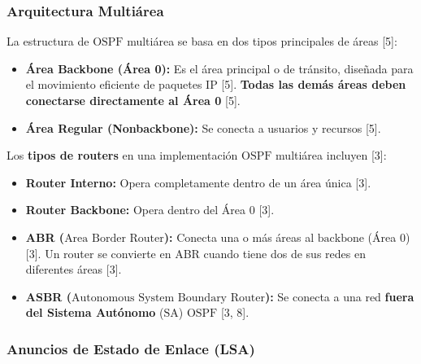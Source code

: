 \documentclass[a5paper]{book}%
\begin{document}
  \subsubsection*{Arquitectura Multiárea}
  
  La estructura de $\text{OSPF}$ multiárea se basa en dos tipos principales de áreas [5]:
  \begin{itemize}
  	\item \textbf{Área Backbone (Área 0):} Es el área principal o de tránsito, diseñada para el movimiento eficiente de paquetes $\text{IP}$ [5]. \textbf{Todas las demás áreas deben conectarse directamente al Área 0} [5].
  	\item \textbf{Área Regular (Nonbackbone):} Se conecta a usuarios y recursos [5].
  \end{itemize}
  
  Los \textbf{tipos de routers} en una implementación $\text{OSPF}$ multiárea incluyen [3]:
  \begin{itemize}
  	\item \textbf{Router Interno:} Opera completamente dentro de un área única [3].
  	\item \textbf{Router Backbone:} Opera dentro del Área 0 [3].
  	\item \textbf{ABR ($\text{Area Border Router}$):} Conecta una o más áreas al $\text{backbone}$ (Área 0) [3]. Un router se convierte en ABR cuando tiene dos de sus redes en diferentes áreas [3].
  	\item \textbf{ASBR ($\text{Autonomous System Boundary Router}$):} Se conecta a una red \textbf{fuera del Sistema Autónomo} ($\text{SA}$) $\text{OSPF}$ [3, 8].
  \end{itemize}
  
  \subsubsection*{Anuncios de Estado de Enlace (LSA)}
  
\end{document}
